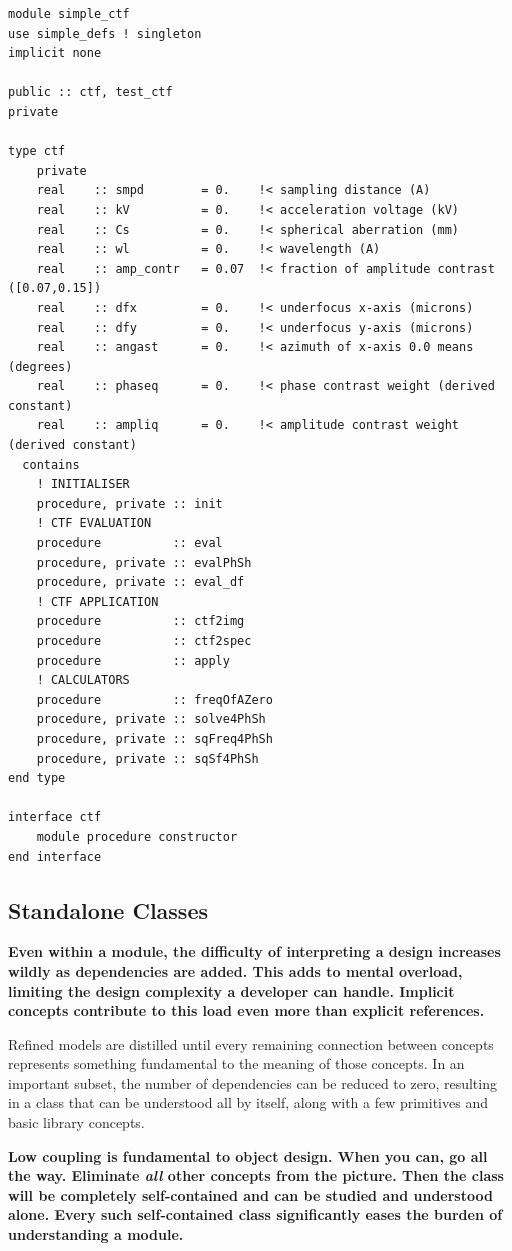 \documentclass[a4paper,11pt]{article}
\begin{document}
\begin{verbatim}
module simple_ctf
use simple_defs ! singleton
implicit none

public :: ctf, test_ctf
private

type ctf
    private
    real    :: smpd        = 0.    !< sampling distance (A)
    real    :: kV          = 0.    !< acceleration voltage (kV) 
    real    :: Cs          = 0.    !< spherical aberration (mm)
    real    :: wl          = 0.    !< wavelength (A)
    real    :: amp_contr   = 0.07  !< fraction of amplitude contrast ([0.07,0.15])
    real    :: dfx         = 0.    !< underfocus x-axis (microns)
    real    :: dfy         = 0.    !< underfocus y-axis (microns)
    real    :: angast      = 0.    !< azimuth of x-axis 0.0 means (degrees)
    real    :: phaseq      = 0.    !< phase contrast weight (derived constant)
    real    :: ampliq      = 0.    !< amplitude contrast weight (derived constant)
  contains
    ! INITIALISER
    procedure, private :: init
    ! CTF EVALUATION
    procedure          :: eval
    procedure, private :: evalPhSh
    procedure, private :: eval_df
    ! CTF APPLICATION
    procedure          :: ctf2img
    procedure          :: ctf2spec
    procedure          :: apply
    ! CALCULATORS
    procedure          :: freqOfAZero
    procedure, private :: solve4PhSh
    procedure, private :: sqFreq4PhSh
    procedure, private :: sqSf4PhSh
end type

interface ctf
    module procedure constructor
end interface
\end{verbatim}

\subsection{Standalone Classes}
\textbf{Even within a module, the difficulty of interpreting a design increases wildly as dependencies are added. This adds to mental overload, limiting the design complexity a developer can handle. Implicit concepts contribute to this load even more than explicit references.}

Refined models are distilled until every remaining connection between concepts represents something fundamental to the meaning of those concepts. In an important subset, the number of dependencies can be reduced to zero, resulting in a class that can be understood all by itself, along with a few primitives and basic library concepts.

\textbf{Low coupling is fundamental to object design. When you can, go all the way. Eliminate \textit{all} other concepts from the picture. Then the class will be completely self-contained and can be studied and understood alone. Every such self-contained class significantly eases the burden of understanding a module.}
\end{document}
